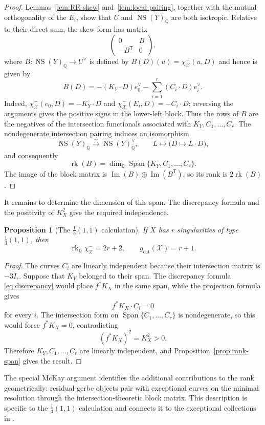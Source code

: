 \documentclass[11pt]{article}
\theoremstyle{plain}
\newtheorem{proposition}[theorem]{Proposition}
\theoremstyle{definition}
\theoremstyle{remark}
\newcommand{\cX}{\mathcal X}
\newcommand{\NS}{\operatorname{NS}}
\newcommand{\rk}{\operatorname{rk}}
\newcommand{\Span}{\operatorname{Span}}
\newcommand{\Q}{\mathbb Q}
\newcommand{\1}{\mathbf 1}
\begin{document}
\begin{proof}
Lemmas~\ref{lem:RR-skew} and~\ref{lem:local-pairing}, together with the mutual orthogonality of the $E_i$, show that $U$ and $\NS(Y)_{\Q}$ are both isotropic.  Relative to their direct sum, the skew form has matrix
\[
\begin{pmatrix}
0&B\\
-B^{\mathsf T}&0
\end{pmatrix},
\]
where $B:\NS(Y)_{\Q}\to U^\vee$ is defined by $B(D)(u)=\chi^-_{\cX}(u,D)$ and hence is given by
\[
B(D)=-(K_Y\cdot D)e_0^\vee
-\sum_{i=1}^r(C_i\cdot D)e_i^\vee.
\]
Indeed, $\chi^-_{\cX}(e_0,D)=-K_Y\cdot D$ and $\chi^-_{\cX}(E_i,D)=-C_i\cdot D$; reversing the arguments gives the positive signs in the lower-left block.  Thus the rows of $B$ are the negatives of the intersection functionals associated with $K_Y,C_1,\dots,C_r$.  The nondegenerate intersection pairing induces an isomorphism
\[
\NS(Y)_{\Q}\xrightarrow{\sim}\NS(Y)_{\Q}^\vee,
\qquad
L\longmapsto\bigl(D\longmapsto L\cdot D\bigr),
\]
and consequently
\[
\rk(B)=\dim_{\Q}\Span\{K_Y,C_1,\dots,C_r\}.
\]
The image of the block matrix is $\operatorname{Im}(B)\oplus\operatorname{Im}(B^{\mathsf T})$, so its rank is $2\rk(B)$.
\end{proof}

It remains to determine the dimension of this span.  The discrepancy formula and the positivity of $K_X^2$ give the required independence.

\begin{proposition}[The $\frac13(1,1)$ calculation]\label{prop:third-rank}
If $X$ has $r$ singularities of type $\frac13(1,1)$, then
\[
\boxed{
\rk_{\Q}\chi^-_{\cX}=2r+2,
\qquad
g_{\mathrm{cat}}(\cX)=r+1.}
\]
\end{proposition}

\begin{proof}
The curves $C_i$ are linearly independent because their intersection matrix is $-3I_r$.  Suppose that $K_Y$ belonged to their span.  The discrepancy formula \eqref{eq:discrepancy} would place $f^*K_X$ in the same span, while the projection formula gives
\[
f^*K_X\cdot C_i=0
\]
for every $i$.  The intersection form on $\Span\{C_1,\dots,C_r\}$ is nondegenerate, so this would force $f^*K_X=0$, contradicting
\[
(f^*K_X)^2=K_X^2>0.
\]
Therefore $K_Y,C_1,\dots,C_r$ are linearly independent, and Proposition~\ref{prop:rank-span} gives the result.
\end{proof}

The special McKay argument identifies the additional contributions to the rank geometrically: residual-gerbe objects pair with exceptional curves on the minimal resolution through the intersection-theoretic block matrix.  This description is specific to the $\frac13(1,1)$ calculation and connects it to the exceptional collections in \cite{GS}.
\end{document}

